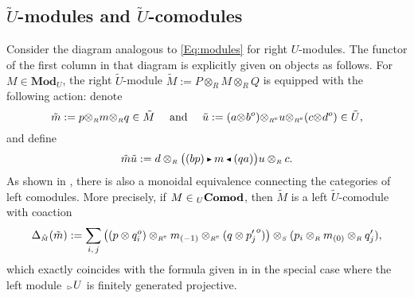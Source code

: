 \documentclass[reqno, a4paper, 10pt]{amsart}
\numberwithin{equation}{section}
\theoremstyle{plain}
\theoremstyle{definition}
\theoremstyle{remark}
\begin{document}
\subsection{$\tilde{U}$-modules and $\tilde{U}$-comodules}
\label{ssection:mod comod} 
Consider the diagram 
analogous to \eqref{Eq:modules} for right $U$-modules.
The functor of the first column in that diagram is explicitly given on objects as follows. 
For $M \in {\mathbf{Mod}}_{U}$, the right ${\tilde{{U}}}$-module $\tilde{M} := P \otimes_R M \otimes_R Q$ is equipped with the following action: 
denote 
$$
\tilde{m} := p{\otimes_{\scriptscriptstyle{{R}}}}m{\otimes_{\scriptscriptstyle{{R}}}}q \in {\tilde{{M}}}\quad \text{ and }\quad {\tilde{{u}}} := (a{\otimes_{\scriptscriptstyle{{}}}}b^o){\otimes_{\scriptscriptstyle{{\scriptscriptstyle{{R^{\rm e}}}}}}}u{\otimes_{\scriptscriptstyle{{\scriptscriptstyle{{R^{\rm e}}}}}}} (c{\otimes_{\scriptscriptstyle{{}}}}d^o) \in {\tilde{{U}}},
$$
and define
\begin{equation}\label{Eq:act_tildeM}
{\tilde{{m}}} {\tilde{{u}}} := 
d \otimes_{{\scriptscriptstyle{R}}} \big((bp) {{\,\raise1pt\hbox{$\scriptscriptstyle{\blacktriangleright}$} \, }} m {{\,\raise1pt\hbox{$\scriptscriptstyle{\blacktriangleleft}$} \, }} (qa)\big) u \otimes_{{\scriptscriptstyle{R}}} c.
\end{equation}
As shown in \cite{Schau:MBCIQG}, there is also a monoidal equivalence connecting  
the categories of left  comodules. 
More precisely,  if $M \in {}_U\bf Comod$, then $\tilde{M}$ is a left $\tilde{U}$-comodule with coaction
\begin{equation}\label{Eq:coact_tildeM}
{\Delta}_{\tilde{{\scriptscriptstyle{M}}}}({\tilde{{m}}}) := \sum_{i,\, j} \big((p \otimes q_i^o) \otimes_{{\scriptscriptstyle{{R^{\rm e}}}}} m_{(-1)} \otimes_{{\scriptscriptstyle{{R^{\rm e}}}}} (q \otimes {p'_j}^o)\big) \otimes_{{\scriptscriptstyle{S}}} (p_i \otimes_{{\scriptscriptstyle{R}}} m_{(0)} \otimes_{{\scriptscriptstyle{R}}} q'_j),
\end{equation}
which exactly coincides with the formula given in \cite{Schau:MBCIQG} in the special case where the left module ${{}_{{{{\,\raise1pt\hbox{$\scriptscriptstyle{\rhd}$} \, }} \!}} {U}_{{\! {}}}\,}$ is finitely generated projective. 
\end{document}
